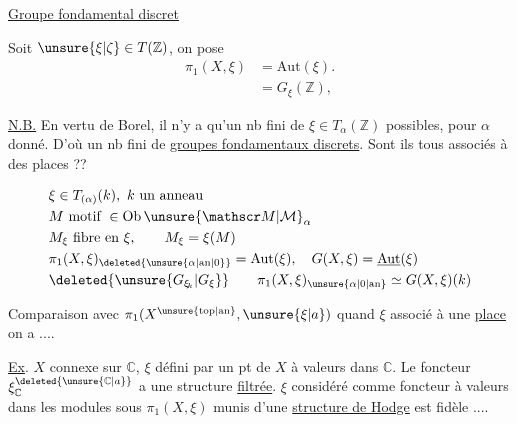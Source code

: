 \uline{Groupe fondamental  discret}

Soit $\unsure{\xi|\zeta}\in T(\mathbb Z)$, on pose
\[
\begin{aligned}
\pi_1(X,\xi)&=\mathrm{Aut}(\xi).\\
             &=G_{\xi}(\mathbb Z),
\end{aligned}
\]

\uline{N.B.} En vertu de Borel, il n'y a qu'un nb fini de $\xi\in T_{\alpha}(\mathbb Z)$ possibles, pour $\alpha$ donné. D'où un nb fini de \uline{groupes fondamentaux discrets}. Sont ils tous associés à des  places ??

\[
\begin{aligned}
&\xi\in T_{(\alpha)}(k),\ k\text{ un anneau}\\
&M\text{ motif }\in\mathrm{Ob}\,\unsure{\mathscr M|\mathcal M}_{\alpha}\\
&M_{\xi}\text{ fibre en }\xi,\qquad M_{\xi}=\xi(M)\\
&\pi_1(X,\xi)_{\deleted{\unsure{\alpha|\mathrm{an}|0}}}=\mathrm{Aut}(\xi),\quad
G(X,\xi)=\underline{\mathrm{Aut}}(\xi)\\
&\deleted{\unsure{G_{\xi_{\!k}}|G_{\xi}}}\qquad \pi_1(X,\xi)_{\unsure{\alpha|0|\mathrm{an}}}\simeq G(X,\xi)(k)
\end{aligned}
\]

Comparaison avec $\pi_1(X^{\unsure{\mathrm{top}|\mathrm{an}}},\unsure{\xi|a})$ quand $\xi$ associé à une \uline{place} on a ....

\uline{Ex}. $X$ connexe sur $\mathbb C$, $\xi$ défini par un pt de $X$ à valeurs dans $\mathbb C$. Le foncteur $\xi_{\mathbb C}^{\deleted{\unsure{\mathbb C|a}}}$ a une structure \uline{filtrée}. $\xi$ considéré comme foncteur à valeurs dans les modules sous $\pi_1(X,\xi)$ munis d'une \uline{structure de Hodge} est  fidèle ....


